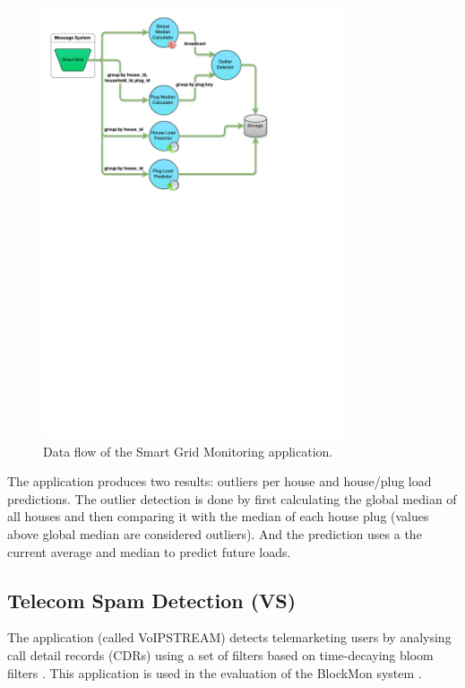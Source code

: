 \documentclass[ppgc,diss,english]{iiufrgs}
\begin{document}
\begin{figure}[H]
	\centering
	\includegraphics[width=0.8\textwidth]{images/apps/SmartGrid.pdf}
	\caption{Data flow of the Smart Grid Monitoring application.}
	\label{fig:app_smart_grid}
\end{figure}

The application produces two results: outliers per house and house/plug load predictions. The outlier detection is done by first calculating the global median of all houses and then comparing it with the median of each house plug (values above global median are considered outliers). And the prediction uses a the current average and median to predict future loads.

\subsection{Telecom Spam Detection (VS)}

The application (called VoIPSTREAM) detects telemarketing users by analysing call detail records (CDRs) using a set of filters based on time-decaying bloom filters \cite{bianchi2011demand}. This application is used in the evaluation of the BlockMon system \cite{huici2012blockmon}.
\end{document}
